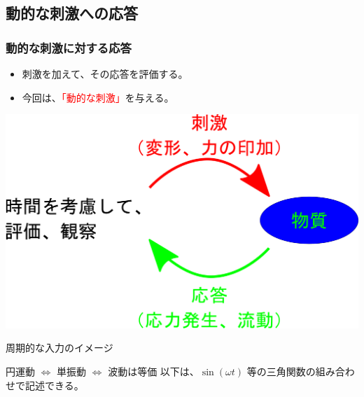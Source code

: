 \documentclass[unicode,12pt]{beamer}%
\begin{document}
\subsection{動的な刺激への応答}
\begin{frame}
	\frametitle{動的な刺激に対する応答}
	\begin{itemize}
		\item 刺激を加えて、その応答を評価する。
		\item 今回は、\textcolor{red}{「動的な刺激」}を与える。
	\end{itemize}

	\vspace{5mm}
			\centering
				\includegraphics[width=.75\textwidth]{Rheo_method.png}
\end{frame}

\begin{frame}{周期的な入力のイメージ}
	\begin{exampleblock}{円運動 $\Leftrightarrow$ 単振動 $\Leftrightarrow$ 波動は等価}
		以下は、$\sin(\omega t)$ 等の三角関数の組み合わせで記述できる。

		\vspace{3mm}
		\centering
	\end{exampleblock}
\end{frame}
\end{document}
